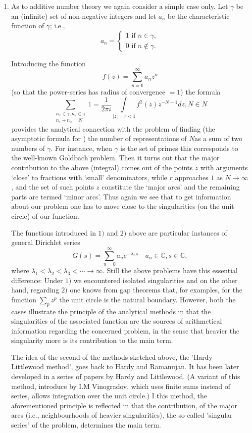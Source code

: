 \begin{enumerate}[1)]
\item As to additive number theory we again consider a simple case
  only. Let $\gamma$ be an (infinite) set of non-negative integers and
  let $a_n$ be the characteristic function of $\gamma$; i.e., 
$$
a_n=
\begin{cases}
1 \text{ if } n \in \gamma,\\ 0 \text{ if } n \not\in \gamma.
\end{cases}
$$

\noindent
Introducing the function
$$
f(z)= \sum_{n=0}^{\infty} a_n z^n
$$
(so that the power-series has radius of convergence $=1$) the formula
$$
\sum_{\substack{n_1 \in \gamma , n_2 \in \gamma \\ n_1+ n_2 =N}} 1=
\frac{1}{2 \pi i} \int\limits_{|z| = r< 1} f^2 (z) z^{-N-1}dz , N\in N 
$$
provides the analytical connection with the problem of finding (the
asymptotic formula for ) the number of representations of $N$as a sum
of two numbers of $\gamma$. For instance, when $\gamma$ is the set of
primes this corresponds to the well-known Goldbach problem. Then it
turns out that the major contribution to the above (integral) comes
out of the points $z$ with arguments `close' to fractions with `small'
denominators, while $r$ approaches $1$ as $N \to \infty$, and the set
of such points $z$ constitute the `major arcs' and the remaining parts
are termed `minor arcs'. Thus again we see that to get information
about our problem one has to move close to the singularities (on the
unit circle) of our function. 

The functions introduced in $1)$ and $2)$ above are particular
instances of general Dirichlet series 
$$
G(s)= \sum_{n=0}^{\infty} a_n e^{-\lambda_n s} \quad a_n \in \mathbb{C}, s \in \mathbb{C},
$$
where $\lambda_1 < \lambda_2 < \lambda_3 < \cdots \to \infty$. Still
the above problems have this essential difference: Under $1)$ we
encountered isolated singularities and on the other hand, regarding
$2)$ one knows from gap theorems that, for examples, for  the function
$\sum\limits_{p} z^p$ the unit circle is the natural
boundary. However, both the cases illustrate the principle of the
analytical methods in that the singularities of the associated function
are the sources of arithmetical information regarding the concerned
problem, in the sense that heavier the singularity more is its
contribution to the main term. 

The idea of the second of the methods sketched above, the 'Hardy -
Littlewood method', goes back to Hardy and Ramanujan. It has been
later developed in a series of papers by Hardy and Littlewood. (A
variant of this method, introduce by I.M Vinogradov, which uses finite
sums instead of series, allows integration over the unit circle.) I
this method, the aforementioned principle is reflected in that the
contribution, of the major arcs (i.e., neighbourhoods of heavier
singularities), the so-called 'singular series' of the problem,
determines the main term.  


\end{enumerate}
